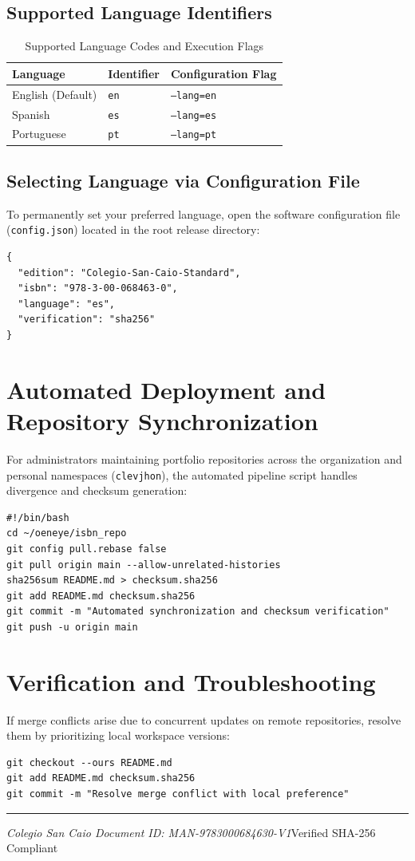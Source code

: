\documentclass[11pt, a4paper]{article}
\begin{document}
\subsection{Supported Language Identifiers}
\begin{table}[h]
\centering
\begin{tabular}{lll}
\toprule
\textbf{Language} & \textbf{Identifier} & \textbf{Configuration Flag} \\
\midrule
English (Default) & \texttt{en} & \texttt{--lang=en} \\
Spanish & \texttt{es} & \texttt{--lang=es} \\
Portuguese & \texttt{pt} & \texttt{--lang=pt} \\
\bottomrule
\end{tabular}
\caption{Supported Language Codes and Execution Flags}
\label{tab:languages}
\end{table}

\subsection{Selecting Language via Configuration File}
To permanently set your preferred language, open the software configuration file (\texttt{config.json}) located in the root release directory:

\begin{verbatim}
{
  "edition": "Colegio-San-Caio-Standard",
  "isbn": "978-3-00-068463-0",
  "language": "es",
  "verification": "sha256"
}
\end{verbatim}

\section{Automated Deployment and Repository Synchronization}
For administrators maintaining portfolio repositories across the organization and personal namespaces (\texttt{clevjhon}), the automated pipeline script handles divergence and checksum generation:

\begin{verbatim}
#!/bin/bash
cd ~/oeneye/isbn_repo
git config pull.rebase false
git pull origin main --allow-unrelated-histories
sha256sum README.md > checksum.sha256
git add README.md checksum.sha256
git commit -m "Automated synchronization and checksum verification"
git push -u origin main
\end{verbatim}

\section{Verification and Troubleshooting}
If merge conflicts arise due to concurrent updates on remote repositories, resolve them by prioritizing local workspace versions:

\begin{verbatim}
git checkout --ours README.md
git add README.md checksum.sha256
git commit -m "Resolve merge conflict with local preference"
\end{verbatim}

\vfill
\noindent\rule{\textwidth}{0.4pt}
{\small \textit{Colegio San Caio Document ID: MAN-9783000684630-V1}\hfill Verified SHA-256 Compliant}
\end{document}
